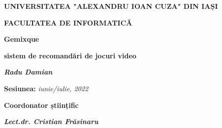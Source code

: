 \documentclass[12pt,a4paper]{report}
\begin{document}

\begin{titlepage}
	\centering
	{\scshape\large \textbf{UNIVERSITATEA "ALEXANDRU IOAN CUZA" DIN IAȘI} \par}
	\vspace{0.5cm}
	{\scshape\Large \textbf{FACULTATEA DE INFORMATICĂ}\par}
	\vspace{5cm}


	{\huge\bfseries Gemixque\par}
	\vspace{1cm}
	{\normalsize \textbf{sistem de recomandări de jocuri video}\par}
	\vspace{3cm}
	{\Large\itshape\textbf {Radu Damian}\par}
	\vspace{2cm}
	{\normalsize \textbf{Sesiunea:} \textit{iunie/iulie, 2022}\par}
	\vspace{4cm}
	{\normalsize \textbf{Coordonator științific}\par}
	\vspace{0.5cm}
	{\Large\itshape\textbf {Lect.dr. Cristian Frăsinaru}\par}
\end{titlepage}
\end{document}
